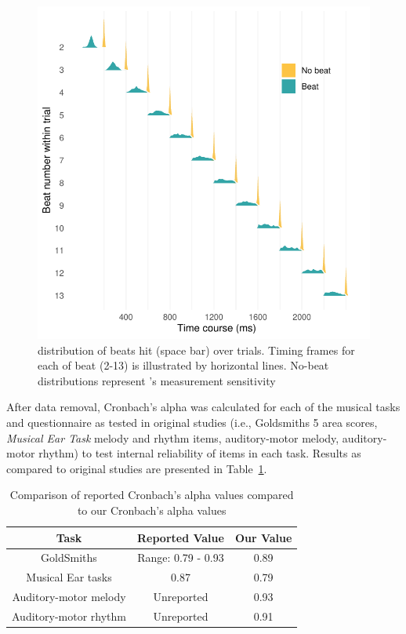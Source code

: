 \documentclass[a4paper]{article}
\begin{document}
\begin{figure}[t]
  \centering
  \includegraphics[width=\linewidth]{SP_24_visuals/Correct_and_Incorrect_distrubutions_by_beat_across_trial.pdf}
  \caption{distribution of beats hit (space bar) over trials. Timing frames for each of beat (2-13) is illustrated by horizontal lines. No-beat distributions represent \cite{gorilla_Anwyl-Irvine_2019}'s measurement sensitivity}
  \label{fig:beat_data}
\end{figure}

After data removal, Cronbach's alpha was calculated for each of the musical tasks and questionnaire as tested in original studies (i.e., Goldsmiths 5 area scores, \textit{Musical Ear Task} melody and rhythm items, auditory-motor melody, auditory-motor rhythm) to test internal reliability of items in each task. Results as compared to original studies are presented in Table~\ref{tab:comparison}. 

\begin{table}[ht]
\centering
\begin{tabular}{|c|c|c|}
\hline
\textbf{Task} & \textbf{Reported Value} & \textbf{Our Value} \\
\hline
GoldSmiths \cite{Müllensiefen_Gingras_Musil_Stewart_2014} & Range: 0.79 - 0.93 & 0.89 \\
Musical Ear tasks \cite{Wallentin_Nielsen_Friis-Olivarius_Vuust_Vuust_2010}& 0.87 & 0.79 \\
Auditory-motor melody \cite{Kachlicka_Saito_Tierney_2019}& Unreported & 0.93 \\
Auditory-motor rhythm\cite{Kachlicka_Saito_Tierney_2019}& Unreported & 0.91 \\
\hline
\end{tabular}
\caption{Comparison of reported Cronbach's alpha values compared to our Cronbach's alpha values}
\label{tab:comparison}
\end{table}
\end{document}
